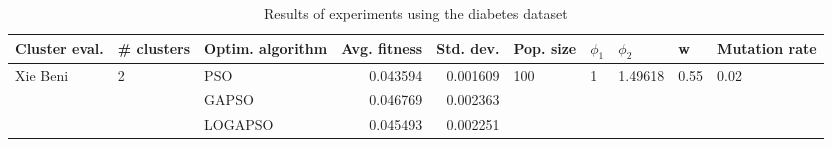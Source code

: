 \begin{table}
\centering
\caption{Results of experiments using the diabetes dataset}
\begin{tabular}{lllrrlllll}
\toprule
            Cluster eval. &        \# clusters & Optim. algorithm &  Avg. fitness &  Std. dev. &            Pop. size &         $\phi_{1}$ &               $\phi_{2}$ &                     w &         Mutation rate \\
\midrule
\multirow{3}{*}{Xie Beni} & \multirow{3}{*}{2} &              PSO &      0.043594 &   0.001609 & \multirow{3}{*}{100} & \multirow{3}{*}{1} & \multirow{3}{*}{1.49618} & \multirow{3}{*}{0.55} & \multirow{3}{*}{0.02} \\
                          &                    &            GAPSO &      0.046769 &   0.002363 &                      &                    &                          &                       &                       \\
                          &                    &          LOGAPSO &      0.045493 &   0.002251 &                      &                    &                          &                       &                       \\
\bottomrule
\end{tabular}
\end{table}
